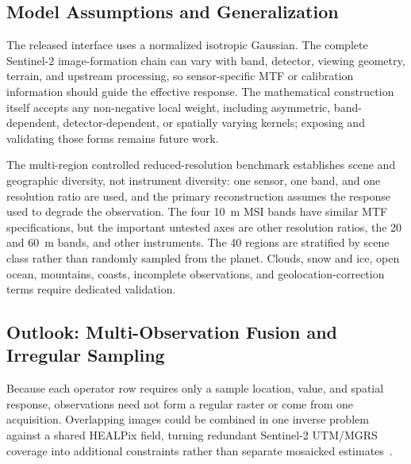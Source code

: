 \documentclass[journal]{IEEEtran}
\newcommand{\healpix}{HEALPix\xspace}
\begin{document}
\subsection{Model Assumptions and Generalization}
\label{sec:generalization}

The released interface uses a normalized isotropic Gaussian. The complete
Sentinel-2 image-formation chain can vary with band, detector, viewing
geometry, terrain, and upstream processing, so sensor-specific MTF or
calibration information should guide the effective response. The
mathematical construction itself accepts any non-negative local weight,
including asymmetric, band-dependent, detector-dependent, or spatially
varying kernels; exposing and validating those forms remains future work.

The multi-region controlled reduced-resolution benchmark establishes scene and geographic diversity, not
instrument diversity: one sensor, one band, and one resolution ratio are used,
and the primary reconstruction assumes the response used to degrade the
observation. The four 10~m MSI bands have similar MTF specifications, but the
important untested axes are other resolution ratios, the 20 and 60~m bands,
and other instruments. The 40 regions are stratified by scene class rather
than randomly sampled from the planet. Clouds, snow and ice, open ocean,
mountains, coasts, incomplete observations, and geolocation-correction terms
require dedicated validation.

\subsection{Outlook: Multi-Observation Fusion and Irregular Sampling}
\label{sec:outlook_fusion}

Because each operator row requires only a sample location, value,
and spatial response, observations need not form a regular raster or
come from one acquisition. Overlapping images could be combined in
one inverse problem against a shared \healpix field, turning
redundant Sentinel-2 UTM/MGRS coverage into additional constraints
rather than separate mosaicked estimates~\cite{bauer2023wasting}.
\end{document}
